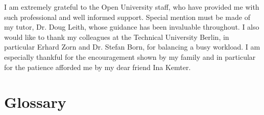 \begin{acknowledgements}
\addchaptertocentry{\acknowledgementname} %
I am extremely grateful to the Open University staff, who have provided me with such professional and well informed support. Special mention must be made of my tutor, Dr. Doug Leith, whose guidance has been invaluable throughout. I also would like to thank my colleagues at the Technical University Berlin, in particular Erhard Zorn and Dr. Stefan Born, for balancing a busy workload. I am especially thankful for the encouragement shown by my family and in particular for the patience afforded me by my dear friend Ina Kemter.
\end{acknowledgements}


\tableofcontents %



\chapter{Glossary}

